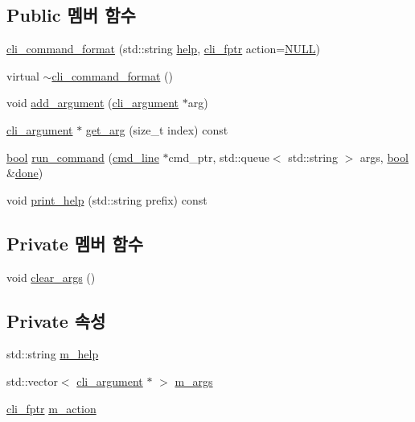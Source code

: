 \subsection*{Public 멤버 함수}
\begin{DoxyCompactItemize}
\item 
\hyperlink{classcli__command__format_a676b0c085ed197f4a71d8f4fc9cc40bc}{cli\+\_\+command\+\_\+format} (std\+::string \hyperlink{simple__rx_8c_ad8c51bbfda76f19f61c727838e6eee30}{help}, \hyperlink{cli__command__format_8h_ae653822399d63f2406b7522456b335e0}{cli\+\_\+fptr} action=\hyperlink{openavb__types__base__pub_8h_a070d2ce7b6bb7e5c05602aa8c308d0c4}{N\+U\+LL})
\item 
virtual \hyperlink{classcli__command__format_a9f811e046743aea9bd3ea35695d51b26}{$\sim$cli\+\_\+command\+\_\+format} ()
\item 
void \hyperlink{classcli__command__format_ac3fc6d13a227c195d5ee6f7b78eba9cd}{add\+\_\+argument} (\hyperlink{classcli__argument}{cli\+\_\+argument} $\ast$arg)
\item 
\hyperlink{classcli__argument}{cli\+\_\+argument} $\ast$ \hyperlink{classcli__command__format_a0b6dc77592cc92a9b864b23a30b945c7}{get\+\_\+arg} (size\+\_\+t index) const 
\item 
\hyperlink{avb__gptp_8h_af6a258d8f3ee5206d682d799316314b1}{bool} \hyperlink{classcli__command__format_a4ca4ef77ff12c0970259279f5fcf488a}{run\+\_\+command} (\hyperlink{classcmd__line}{cmd\+\_\+line} $\ast$cmd\+\_\+ptr, std\+::queue$<$ std\+::string $>$ args, \hyperlink{avb__gptp_8h_af6a258d8f3ee5206d682d799316314b1}{bool} \&\hyperlink{mrp_validate_8c_a5992b274cfdcacdbc1fa8347fd01ebde}{done})
\item 
void \hyperlink{classcli__command__format_a05534021690bfd256352ede537d856c9}{print\+\_\+help} (std\+::string prefix) const 
\end{DoxyCompactItemize}
\subsection*{Private 멤버 함수}
\begin{DoxyCompactItemize}
\item 
void \hyperlink{classcli__command__format_ad46a6518742ee179bb193810418aced9}{clear\+\_\+args} ()
\end{DoxyCompactItemize}
\subsection*{Private 속성}
\begin{DoxyCompactItemize}
\item 
std\+::string \hyperlink{classcli__command__format_a3985971d45415a337f60ed183b445c96}{m\+\_\+help}
\item 
std\+::vector$<$ \hyperlink{classcli__argument}{cli\+\_\+argument} $\ast$ $>$ \hyperlink{classcli__command__format_a5a62a08dfd884e04cb69fa9427ff060c}{m\+\_\+args}
\item 
\hyperlink{cli__command__format_8h_ae653822399d63f2406b7522456b335e0}{cli\+\_\+fptr} \hyperlink{classcli__command__format_a916e0e89f5ab664eb3cbcc7c2401a0df}{m\+\_\+action}
\end{DoxyCompactItemize}


